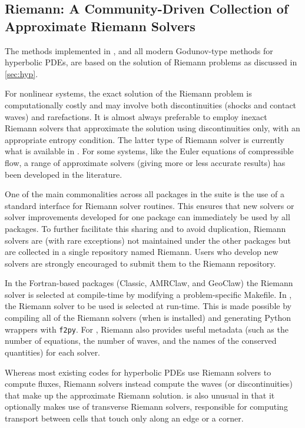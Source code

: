 %
%

\subsection{Riemann: A Community-Driven Collection of Approximate Riemann
Solvers}\label{sec:riemann}

The methods implemented in \clawpack, and all modern Godunov-type methods for
hyperbolic PDEs, are based on the solution of Riemann problems as discussed
in \cref{sec:hyp}.  

For nonlinear systems, the exact solution of the Riemann problem is computationally
costly and may involve both discontinuities (shocks and contact waves) and
rarefactions.  It is almost always preferable to employ inexact Riemann solvers
that approximate the solution using discontinuities only, with an appropriate 
entropy condition.  The latter type
of Riemann solver is currently what is available in \clawpack.  For some systems, like the Euler
equations of compressible flow, a range of approximate solvers (giving 
more or less accurate results) has been developed in the literature.

One of the main commonalities across all packages in the \clawpack suite is the
use of a standard interface for Riemann solver routines.  This ensures that new
solvers or solver improvements developed for one package can immediately
be used by all packages.  To further facilitate this sharing and to avoid 
duplication, Riemann solvers are (with rare exceptions) not maintained under
the other packages but are collected in a single repository named Riemann.
Users who develop new solvers are strongly encouraged to submit them to the
Riemann repository.

In the Fortran-based packages (Classic, AMRClaw, and GeoClaw) the Riemann
solver is selected at compile-time by modifying a problem-specific Makefile.
In \pyclaw, the Riemann solver to be used is selected at run-time.  This is
made possible by compiling all of the Riemann solvers (when \pyclaw is installed)
and generating Python wrappers with \texttt{f2py}.  For \pyclaw, Riemann also provides
useful metadata (such as the number of equations, the number of waves, and
the names of the conserved quantities) for each solver.

Whereas most existing codes for hyperbolic PDEs use Riemann solvers to
compute fluxes, \clawpack Riemann solvers instead compute the waves 
(or discontinuities) that make up the approximate Riemann solution.
\clawpack is also unusual in that it optionally makes use of transverse
Riemann solvers, responsible for computing transport between cells that
touch only along an edge or a corner.
